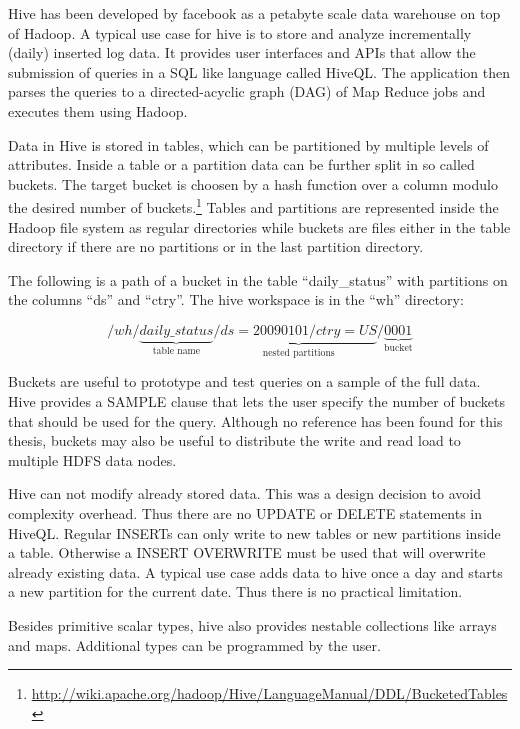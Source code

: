 \documentclass[12pt,a4paper]{scrartcl}		%
\begin{document}
Hive has been developed by facebook as a petabyte scale data warehouse on top of Hadoop.\cite{Thusoo_hive-a} A typical use case for hive is to store and analyze incrementally (daily) inserted log data. It provides user interfaces and APIs that allow the submission of queries in a SQL like language called HiveQL. The application then parses the queries to a directed-acyclic graph (DAG) of Map Reduce jobs and executes them using Hadoop.

Data in Hive is stored in tables, which can be partitioned by multiple levels of attributes. Inside a table or a partition data can be further split in so called buckets. The target bucket is choosen by a hash function over a column modulo the desired number of buckets.\footnote{\url{http://wiki.apache.org/hadoop/Hive/LanguageManual/DDL/BucketedTables}} Tables and partitions are represented inside the Hadoop file system as regular directories while buckets are files either in the table directory if there are no partitions or in the last partition directory.

The following is a path of a bucket in the table ``daily\_status'' with partitions on the columns ``ds'' and ``ctry''. The hive workspace is in the ``wh'' directory:

\begin{displaymath}
  /wh/\underbrace{daily\_status}_{\text{table name}}/\underbrace{ds=20090101/ctry=US}_{\text{nested partitions}}/\underbrace{0001}_{\text{bucket}}
\end{displaymath}

Buckets are useful to prototype and test queries on a sample of the full data. Hive provides a SAMPLE clause that lets the user specify the number of buckets that should be used for the query. Although no reference has been found for this thesis, buckets may also be useful to distribute the write and read load to multiple HDFS data nodes.

Hive can not modify already stored data. This was a design decision to avoid complexity overhead. Thus there are no UPDATE or DELETE statements in HiveQL.\cite{hive-icde2010} Regular INSERTs can only write to new tables or new partitions inside a table. Otherwise a INSERT OVERWRITE must be used that will overwrite already existing data. A typical use case adds data to hive once a day and starts a new partition for the current date. Thus there is no practical limitation.

Besides primitive scalar types, hive also provides nestable collections like arrays and maps. Additional types can be programmed by the user.
\end{document}

